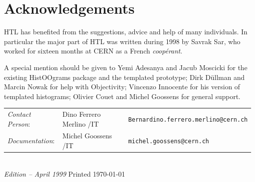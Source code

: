 \section*{Acknowledgements}

HTL has benefited from the suggestions, advice and help of many
individuals.  In particular the major part of HTL was written during
1998 by Savrak Sar, who worked for sixteen months at CERN as a French
\emph{coop\'erant}.

A special mention should be given to Yemi Adesanya and Jacub Moscicki
for the existing HistOOgrams package and the templated prototype; Dirk
D\"ullman and Marcin Nowak for help with Objectivity; Vincenzo
Innocente for his version of templated histograms; Olivier Couet and
Michel Goossens for general support.

\vfill
\begin{flushleft}
\begin{tabular}{@{}l@{\quad}l@{\quad}l}
\emph{Contact Person}:& Dino Ferrero Merlino /IT    & 
                        \texttt{Bernardino.ferrero.merlino@cern.ch}\\
\emph{Documentation}: & Michel Goossens /IT         & 
                        \texttt{michel.goossens@cern.ch}
\end{tabular}\\[5mm]
\emph{Edition -- April 1999} \hfill \footnotesize Printed \today
\end{flushleft}
\newpage

\setcounter{page}{1}

\tableofcontents
\endinput


